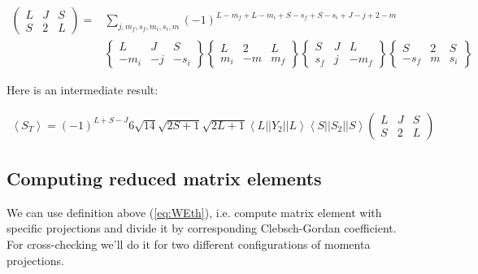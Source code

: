 \begin{align}
    \left(\begin{matrix}
        L & J & S \\
        S & 2 & L
       \end{matrix}\right) = &\sum_{j,m_f,s_f,m_i,s_i,m}
                                    (-1)^{L-m_f + L-m_i + S-s_f + S-s_i + J-j + 2-m} \\ \nonumber
                                    &\left\{\begin{matrix}
                                        L & J & S \\
                                        -m_i & -j & -s_i
                                    \end{matrix}\right\}
                                    \left\{\begin{matrix}
                                        L & 2 & L \\
                                        m_i & -m & m_f
                                    \end{matrix}\right\}
                                    \left\{\begin{matrix}
                                        S & J & L \\
                                        s_f & j & -m_f
                                    \end{matrix}\right\}
                                    \left\{\begin{matrix}
                                        S & 2 & S \\
                                        -s_f & m & s_i
                                    \end{matrix}\right\}
\end{align}

Here is an intermediate result:

\begin{align} \label{eq:STavMid}
    \left<S_T\right> = (-1)^{L+S-J} 6 \sqrt{14} \sqrt{2S+1} \sqrt{2L+1} \left<L||Y_2||L\right> \left<S||S_2||S\right> \left(\begin{matrix}
            L & J & S \\
            S & 2 & L
         \end{matrix}\right)
\end{align}

\subsection{Computing reduced matrix elements}
We can use definition above (\cref{eq:WEth}), i.e. compute matrix element with
specific projections and divide it by corresponding Clebsch-Gordan coefficient.
For cross-checking we'll do it for two different configurations
of momenta projections.

